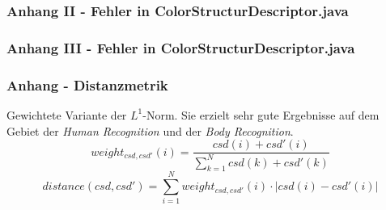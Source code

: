 \documentclass[11pt]{beamer}
\begin{document}
\begin{frame}
	\frametitle{Anhang II - Fehler in ColorStructurDescriptor.java}
	\scriptsize
	
\end{frame}

\begin{frame}
	\frametitle{Anhang III - Fehler in ColorStructurDescriptor.java}
	\scriptsize
	
\end{frame}

\begin{frame}
	\frametitle{Anhang  - Distanzmetrik}
		    Gewichtete Variante der $L^1$-Norm. Sie erzielt sehr gute Ergebnisse auf dem Gebiet der
    \emph{Human Recognition} und der \emph{Body Recognition}.
$$
  weight_{csd,csd'}(i) = \frac{csd(i) + csd'(i)}{\sum\limits_{k = 1}^N csd(k) + csd'(k)}
$$
$$
  distance(csd,csd') = \sum\limits_{i = 1}^N   weight_{csd,csd'}(i) \cdot |csd(i) - csd'(i)|
$$
\end{frame}
\end{document}
